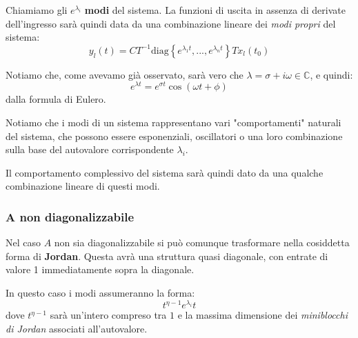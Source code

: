 \documentclass[a4paper,11pt]{article}
\begin{document}
Chiamiamo gli $e^{\lambda_i}$ \textbf{modi} del sistema.
La funzioni di uscita in assenza di derivate dell'ingresso sarà quindi data da una combinazione lineare dei \textit{modi propri} del sistema:
$$
y_l(t) = C T^{-1} \mathrm{diag} \left\{ e^{\lambda_1 t}, ..., e^{\lambda_n t} \right\} T x_l(t_0)
$$

Notiamo che, come avevamo già osservato, sarà vero che $\lambda = \sigma + i \omega \in \mathbb{C}$, e quindi:
$$
e^{\lambda t} = e^{\sigma t} \cos(\omega t + \phi)
$$
dalla formula di Eulero.

\par\smallskip

Notiamo che i modi di un sistema rappresentano vari "comportamenti" naturali del sistema, che possono essere esponenziali, oscillatori o una loro combinazione sulla base del autovalore corrispondente $\lambda_i$.

Il comportamento complessivo del sistema sarà quindi dato da una qualche combinazione lineare di questi modi.

\subsubsection{A non diagonalizzabile}
Nel caso $A$ non sia diagonalizzabile si può comunque trasformare nella cosiddetta forma di \textbf{Jordan}.
Questa avrà una struttura quasi diagonale, con entrate di valore 1 immediatamente sopra la diagonale. 

In questo caso i modi assumeranno la forma:
$$
t^{\eta - 1}e^{\lambda_i} t
$$
dove $t^{\eta - 1}$ sarà un'intero compreso tra $1$ e la massima dimensione dei \textit{miniblocchi di Jordan} associati all'autovalore.
\end{document}
